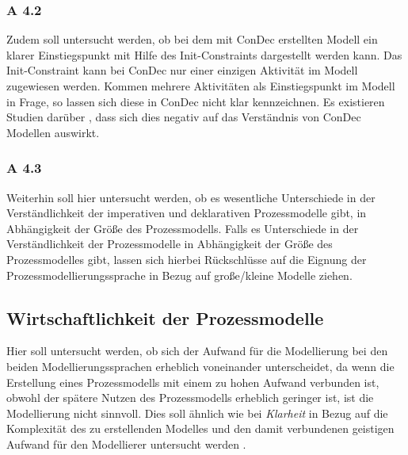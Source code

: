 \subsubsection{A 4.2}
Zudem soll untersucht werden, ob bei dem mit ConDec erstellten Modell ein klarer Einstiegspunkt mit Hilfe des Init-Constraints dargestellt werden kann. Das Init-Constraint kann bei ConDec nur einer einzigen Aktivität im Modell zugewiesen werden. Kommen mehrere Aktivitäten als Einstiegspunkt im Modell in Frage, so lassen sich diese in ConDec nicht klar kennzeichnen. Es existieren Studien darüber \cite{haisjackl2014understanding}, dass sich dies negativ auf das Verständnis von ConDec Modellen auswirkt. \newline

\subsubsection{A 4.3}
Weiterhin soll hier untersucht werden, ob es wesentliche Unterschiede in der Verständlichkeit der imperativen und deklarativen Prozessmodelle gibt, in Abhängigkeit der Größe des Prozessmodells. Falls es Unterschiede in der Verständlichkeit der Prozessmodelle in Abhängigkeit der Größe des Prozessmodelles gibt, lassen sich hierbei Rückschlüsse auf die Eignung der Prozessmodellierungssprache in Bezug auf große/kleine Modelle ziehen.


\subsection{Wirtschaftlichkeit der Prozessmodelle}

Hier soll untersucht werden, ob sich der Aufwand für die Modellierung bei den beiden Modellierungssprachen erheblich voneinander unterscheidet, da wenn die Erstellung eines Prozessmodells mit einem zu hohen Aufwand verbunden ist, obwohl der spätere Nutzen des Prozessmodells erheblich geringer ist, ist die Modellierung nicht sinnvoll. Dies soll ähnlich wie bei \textit{Klarheit} in Bezug auf die Komplexität des zu erstellenden Modelles und den damit verbundenen geistigen Aufwand für den Modellierer untersucht werden \cite{freund2007, journals95, leimeister2012,mendling2010seven}.\newline


